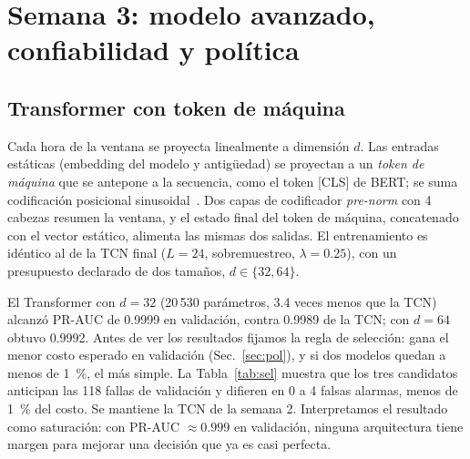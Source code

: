 \documentclass[conference,letterpaper]{IEEEtran}
\begin{document}
\section{Semana 3: modelo avanzado, confiabilidad y política}\label{sec:w3}

\subsection{Transformer con token de máquina}
Cada hora de la ventana se proyecta linealmente a dimensión $d$. Las entradas estáticas (embedding del modelo y antigüedad) se proyectan a un \textit{token de máquina} que se antepone a la secuencia, como el token [CLS] de BERT; se suma codificación posicional sinusoidal~\cite{vaswani}. Dos capas de codificador \textit{pre-norm} con 4 cabezas resumen la ventana, y el estado final del token de máquina, concatenado con el vector estático, alimenta las mismas dos salidas. El entrenamiento es idéntico al de la TCN final ($L=24$, sobremuestreo, $\lambda=0.25$), con un presupuesto declarado de dos tamaños, $d\in\{32,64\}$.

El Transformer con $d=32$ (20\,530 parámetros, 3.4 veces menos que la TCN) alcanzó PR-AUC de 0.9999 en validación, contra 0.9989 de la TCN; con $d=64$ obtuvo 0.9992. Antes de ver los resultados fijamos la regla de selección: gana el menor costo esperado en validación (Sec.~\ref{sec:pol}), y si dos modelos quedan a menos de 1~\%, el más simple. La Tabla~\ref{tab:sel} muestra que los tres candidatos anticipan las 118 fallas de validación y difieren en 0 a 4 falsas alarmas, menos de 1~\% del costo. Se mantiene la TCN de la semana 2. Interpretamos el resultado como saturación: con PR-AUC $\approx 0.999$ en validación, ninguna arquitectura tiene margen para mejorar una decisión que ya es casi perfecta.
\end{document}
